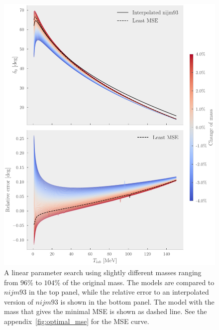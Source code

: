 \begin{figure}[ht]
  \centering
  \includegraphics[]{Figures/change_in_mass.pdf}
  \caption{\label{fig:change_in_mass} A linear parameter search using slightly
    different masses ranging from \(96\)\% to \(104\)\% of the original mass.
    The models are compared to \(nijm93\) in the top panel, while the relative
    error to an interpolated version of \(nijm93\) is shown in the bottom panel.
    The model with the mass that gives the minimal MSE is shown as dashed line.
    See the appendix~\cref{fig:optimal_mse} for the MSE curve.}
\end{figure}




